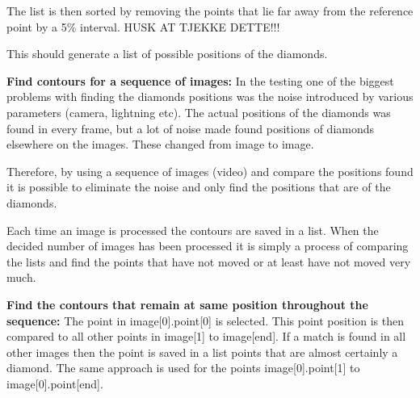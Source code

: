 The list is then sorted by removing the points that lie far away from the reference point by a 5\% interval. HUSK AT TJEKKE DETTE!!!

This should generate a list of possible positions of the diamonds.

\textbf{Find contours for a sequence of images:}
In the testing one of the biggest problems with finding the diamonds positions was the noise introduced by various parameters (camera, lightning etc). The actual positions of the diamonds was found in every frame, but a lot of noise made found positions of diamonds elsewhere on the images. These changed from image to image.

Therefore, by using a sequence of images (video) and compare the positions found it is possible to eliminate the noise and only find the positions that are of the diamonds.

Each time an image is processed the contours are saved in a list. When the decided number of images has been processed it is simply a process of comparing the lists and find the points that have not moved or at least have not moved very much.

\textbf{Find the contours that remain at same position throughout the sequence:}
The point in image[0].point[0] is selected. This point position is then compared to all other points in image[1] to image[end]. If a match is found in all other images then the point is saved in a list points that are almost certainly a diamond. The same approach is used for the points image[0].point[1] to image[0].point[end].
